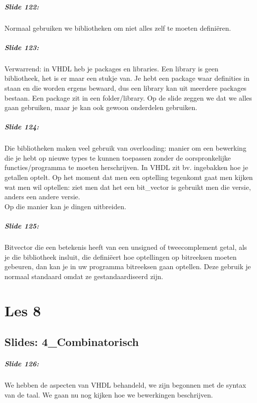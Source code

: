 \documentclass[10pt,a4paper]{book}
\begin{document}
\paragraph{Slide 122:} Normaal gebruiken we bibliotheken om niet alles zelf te moeten defini\"eren.

\paragraph{Slide 123:} Verwarrend: in VHDL heb je packages en libraries. Een library is geen bibliotheek, het is er maar een stukje van. Je hebt een package waar definities in staan en die worden ergens bewaard, dus een library kan uit meerdere packages bestaan. Een package zit in een folder/library. Op de slide zeggen we dat we alles gaan gebruiken, maar je kan ook gewoon onderdelen gebruiken.

\paragraph{Slide 124:} Die bibliotheken maken veel gebruik van overloading: manier om een bewerking die je hebt op nieuwe types te kunnen toepassen zonder de oorspronkelijke functies/programma te moeten herschrijven. In VHDL zit bv. ingebakken hoe je getallen optelt. Op het moment dat men een optelling tegenkomt gaat men kijken wat men wil optellen: ziet men dat het een bit\_vector is gebruikt men die versie, anders een andere versie.\\
Op die manier kan je dingen uitbreiden.

\paragraph{Slide 125:} Bitvector die een betekenis heeft van een unsigned of tweecomplement getal, als je die bibliotheek insluit, die defini\"eert hoe optellingen op bitreeksen moeten gebeuren, dan kan je in uw programma bitreeksen gaan optellen. Deze gebruik je normaal standaard omdat ze gestandaardiseerd zijn.

\chapter{Les 8}

\section{Slides: 4\_Combinatorisch}

\paragraph{Slide 126:} We hebben de aspecten van VHDL behandeld, we zijn begonnen met de syntax van de taal. We gaan nu nog kijken hoe we bewerkingen beschrijven.
\end{document}
